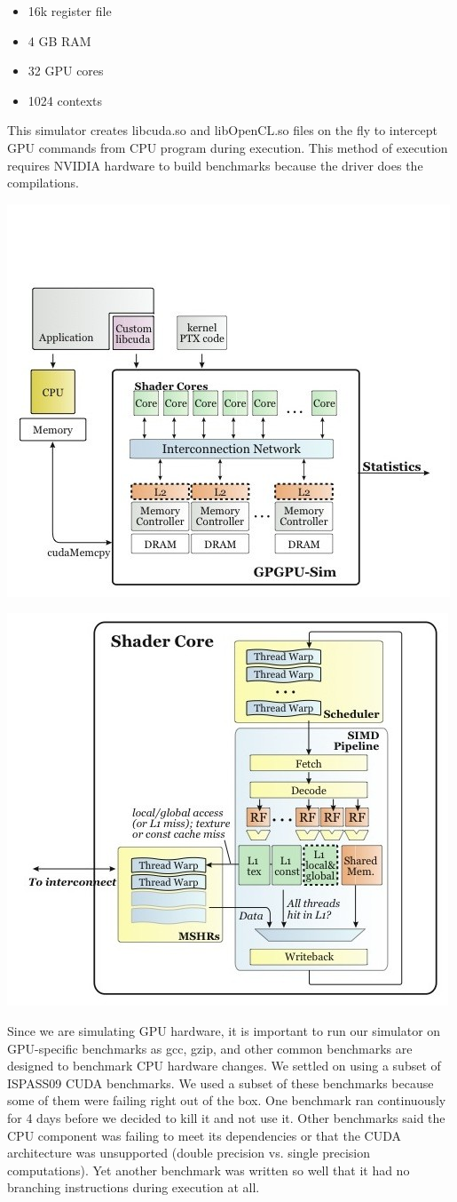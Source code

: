 \documentclass[conference]{IEEEtran}
\begin{document}
\begin{itemize}
	\item 16k register file
	\item 4 GB RAM
	\item 32 GPU cores
	\item 1024 contexts
\end{itemize}

This simulator creates libcuda.so and libOpenCL.so files on the fly to intercept GPU commands from CPU program during execution.  This method of execution requires NVIDIA hardware to build benchmarks because the driver does the compilations.

\begin{center}
	\includegraphics[width=.45\textwidth]{uarch1.jpg}
\end{center}

\begin{center}
	\includegraphics[width=.45\textwidth]{uarch2.jpg}
\end{center}

Since we are simulating GPU hardware, it is important to run our simulator on GPU-specific benchmarks as gcc, gzip, and other common benchmarks are designed to benchmark CPU hardware changes.  We settled on using a subset of ISPASS09 CUDA benchmarks.  We used a subset of these benchmarks because some of them were failing right out of the box.  One benchmark ran continuously for 4 days before we decided to kill it and not use it.  Other benchmarks said the CPU component was failing to meet its dependencies or that the CUDA architecture was unsupported (double precision vs. single precision computations).  Yet another benchmark was written so well that it had no branching instructions during execution at all.
\end{document}
